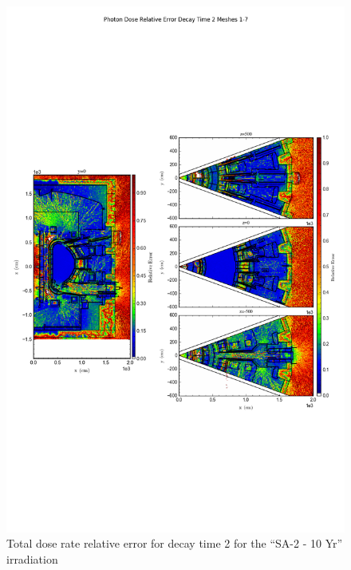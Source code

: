 \documentclass[12pt]{article}
\begin{document}
\begin{figure}[ht!]
\centering
\includegraphics[trim={0cm 8cm, 0cm 8cm},clip,scale=0.75]{../plots/final_model/5year/Photon_Dose_Relative_Error_Decay_Time_2_Meshes_1-7.png}
\caption{Total dose rate relative error for decay time 2 for the ``SA-2 - 10 Yr'' irradiation}
\label{fig:photons_5y_dc2_nob4c_relerr}
\end{figure}
\clearpage
\end{document}
